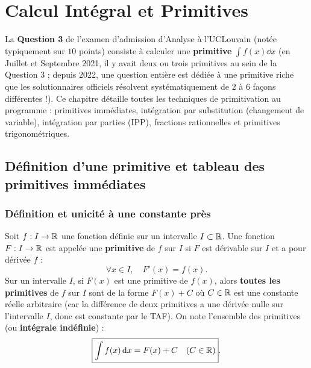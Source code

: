 \chapter{Calcul Intégral et Primitives}

La \textbf{Question 3} de l'examen d'admission d'Analyse à l'UCLouvain (notée typiquement sur $10$ points) consiste à calculer une \textbf{primitive} $\int f(x)\dd x$ (en Juillet et Septembre 2021, il y avait deux ou trois primitives au sein de la Question 3 ; depuis 2022, une question entière est dédiée à une primitive riche que les solutionnaires officiels résolvent systématiquement de $2$ à $6$ façons différentes !). Ce chapitre détaille toutes les techniques de primitivation au programme : primitives immédiates, intégration par substitution (changement de variable), intégration par parties (IPP), fractions rationnelles et primitives trigonométriques.

\section{Définition d'une primitive et tableau des primitives immédiates}

\subsection{Définition et unicité à une constante près}

\begin{definition}
Soit $f : I \to \mathbb{R}$ une fonction définie sur un intervalle $I \subset \mathbb{R}$. Une fonction $F : I \to \mathbb{R}$ est appelée une \textbf{primitive} de $f$ sur $I$ si $F$ est dérivable sur $I$ et a pour dérivée $f$ :
\[
    \boxed{\forall x \in I, \quad F'(x) = f(x)}.
\]
Sur un intervalle $I$, si $F(x)$ est une primitive de $f(x)$, alors \textbf{toutes les primitives} de $f$ sur $I$ sont de la forme $F(x) + C$ où $C \in \mathbb{R}$ est une constante réelle arbitraire (car la différence de deux primitives a une dérivée nulle sur l'intervalle $I$, donc est constante par le TAF). On note l'ensemble des primitives (ou \textbf{intégrale indéfinie}) :
\[
    \boxed{\int f(x)\,\mathrm{d} x = F(x) + C \quad (C \in \mathbb{R})}.
\]
\end{definition}


